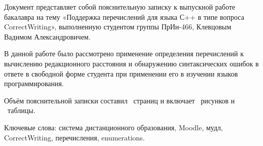 \documentclass[a4paper,english,russian]{G2-105}
\begin{document}
\VSTUSetFacilityExpert{}{}{}{}
\VSTUInitializePZ
{}
\par Документ представляет собой пояснительную записку к выпускной работе бакалавра на тему «Поддержка перечислений для языка С++ в типе вопроса CorrectWriting», выполненную студентом группы ПрИн-466, Клевцовым Вадимом Александровичем.
\par В данной работе было рассмотрено применение определения перечислений к вычислению редакционного расстояния и обнаружению синтаксических ошибок в ответе в свободной форме  студента при применении его в изучении языков программирования.
\par Объём пояснительной записки составил \totalpages~страниц и включает \totalfigures~рисунков и \totaltables~таблицы. 
\par Ключевые слова: система дистанционного образования, Moodle, мудл, CorrectWriting, перечисления, enumerations.
\tableofcontents
\newpage
\end{document}
